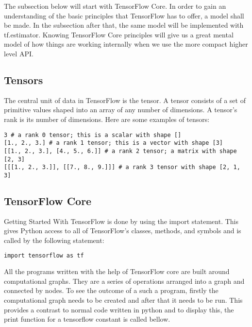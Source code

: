 The subsection below will start with TensorFlow Core. 
In order to gain an understanding of the basic principles that TensorFlow has to offer, a model shall be made. 
In the subsection after that, the same model will be implemented with tf.estimator. 
Knowing TensorFlow Core principles will give us a great mental model of how things are working internally when we use the more compact higher level API.

\subsection{Tensors}
The central unit of data in TensorFlow is the tensor. 
A tensor consists of a set of primitive values shaped into an array of any number of dimensions. 
A tensor's rank is its number of dimensions. 
Here are some examples of tensors:

\begin{adjustbox}{width=\textwidth}
\begin{lstlisting}
3 # a rank 0 tensor; this is a scalar with shape []
[1., 2., 3.] # a rank 1 tensor; this is a vector with shape [3]
[[1., 2., 3.], [4., 5., 6.]] # a rank 2 tensor; a matrix with shape [2, 3]
[[[1., 2., 3.]], [[7., 8., 9.]]] # a rank 3 tensor with shape [2, 1, 3]
\end{lstlisting} 
\end{adjustbox}


\subsection{TensorFlow Core}
Getting Started With TensorFlow is done by using the import statement. 
This gives Python access to all of TensorFlow's classes,
methods, and symbols and is called by the following statement:

\begin{lstlisting}
import tensorflow as tf
\end{lstlisting}

All the programs written with the help of TensorFlow core are built around computational graphs. 
They are a series of operations arranged into a graph and connected by nodes. 
To see the outcome of a such a program, 
firstly the computational graph needs to be created and after that it needs to be run. 
This provides a contrast to normal code written in python and to display this, 
the print function for a tensorflow constant is called bellow.

